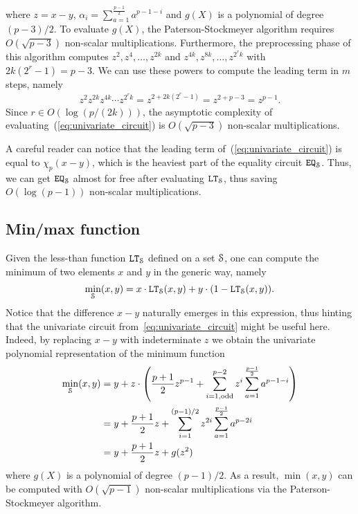  where $z = x - y$, $\alpha_i = \sum_{a=1}^{\frac{p-1}{2}} a^{p-1-i}$ and $g(X)$ is a polynomial of degree $(p-3)/2$.
  To evaluate $g(X)$, the Paterson-Stockmeyer algorithm requires $O(\sqrt{p-3})$ non-scalar multiplications.
  Furthermore, the preprocessing phase of this algorithm computes $z^2, z^4, \dots, z^{2k}$ and $z^{4k}, z^{8k}, \dots, z^{2^r k}$ with $2k(2^r-1) = p-3$.
  We can use these powers to compute the leading term in $m$ steps, namely
  \begin{align*}
    z^2 z^{2k} z^{4k} \cdots z^{2^r k} = z^{2 + 2k(2^r-1)} = z^{2 + p - 3} = z^{p-1}.
  \end{align*}
  Since $r \in O(\log (p/(2k)))$, the asymptotic complexity of evaluating~(\ref{eq:univariate_circuit}) is $O(\sqrt{p-3})$ non-scalar multiplications.
  
  \begin{remark}
    A careful reader can notice that the leading term of~(\ref{eq:univariate_circuit}) is equal to $\chi_p(x-y)$, which is the heaviest part of the equality circuit $\EQ_\S$.
    Thus, we can get $\EQ_\S$ almost for free after evaluating $\LT_\S$, thus saving $O(\log (p-1))$ non-scalar multiplications.
  \end{remark}
\subsection{Min/max function}

  Given the less-than function $\LT_\S$ defined on a set $\S$, one can compute the minimum of two elements $x$ and $y$ in the generic way, namely
  \begin{align*}
    \min_\S(x,y) = x \cdot \LT_\S(x,y) + y \cdot (1 - \LT_\S(x,y)).
  \end{align*}
  Notice that the difference $x - y$ naturally emerges in this expression, thus hinting that the univariate circuit from~\ref{eq:univariate_circuit} might be useful here.
  Indeed, by replacing $x - y$ with indeterminate $z$ we obtain the univariate polynomial representation of the minimum function 
  \begin{align*}
    \min_\S(x,y) & = y + z \cdot \left(\frac{p+1}{2} z^{p-1} + \sum_{i=1, \text{odd}}^{p-2} z^i \sum_{a=1}^{\frac{p-1}{2}} a^{p-1-i}\right) \\
    & = y + \frac{p+1}{2} z + \sum_{i=1}^{(p-1)/2} z^{2i} \sum_{a=1}^{\frac{p-1}{2}} a^{p-2i} \\
    & = y + \frac{p+1}{2} z + g(z^2)
  \end{align*}
  where $g(X)$ is a polynomial of degree $(p-1)/2$. 
  As a result, $\min(x,y)$ can be computed with $O(\sqrt{p-1})$ non-scalar multiplications via the Paterson-Stockmeyer algorithm.

